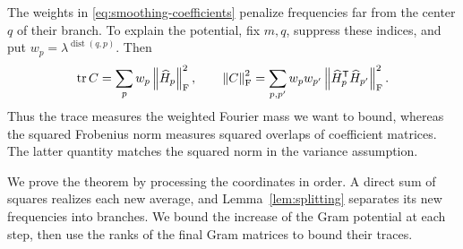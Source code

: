 The weights in \eqref{eq:smoothing-coefficients} penalize frequencies
far from the center $q$ of their branch.  To explain the potential,
fix $m,q$, suppress these indices, and put
$w_p=\lambda^{\operatorname{dist}(q,p)}$.  Then
\[
  \operatorname{tr} C=\sum_p w_p\left\lVert\widehat H_p\right\rVert_{\mathrm F}^2,
  \qquad
  \left\lVert C\right\rVert_{\mathrm F}^2=\sum_{p,p'}w_pw_{p'}
          \left\lVert\widehat H_p^{\mathsf T}\widehat H_{p'}\right\rVert_{\mathrm F}^2.
\]
Thus the trace measures the weighted Fourier mass we want to bound,
whereas the squared Frobenius norm measures squared overlaps of
coefficient matrices.  The latter quantity matches the squared norm
in the variance assumption.

We prove the theorem by processing the coordinates in order.  A direct
sum of squares realizes each new average, and
Lemma~\ref{lem:splitting} separates its new frequencies into branches.
We bound the increase of the Gram potential at each step, then use
the ranks of the final Gram matrices to bound their traces.

